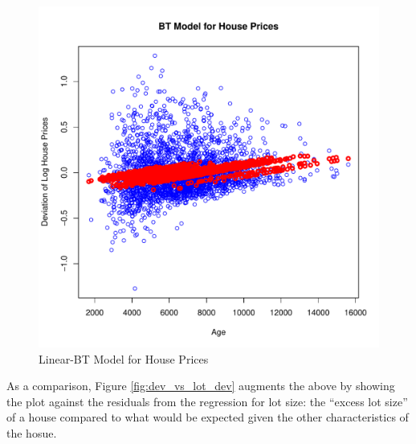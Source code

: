 \begin{figure}[h!]
  \centering
  \includegraphics[scale = 0.5, keepaspectratio=true]{../Figures/dev_vs_lot}
  \caption{Linear-BT Model for House Prices} \label{fig:dev_vs_lot}
\end{figure}



\pagebreak
As a comparison, Figure \ref{fig:dev_vs_lot_dev} 
augments the above by showing the plot against the 
residuals from the regression for lot size:
the ``excess lot size'' of a house compared to what would be 
expected given the other characteristics of the hosue. 


